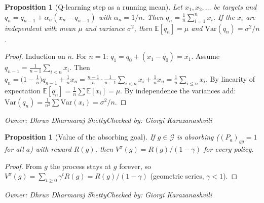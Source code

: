\documentclass[10pt]{article}
\newtheorem{proposition}[theorem]{Proposition}
\theoremstyle{definition}
\newcommand{\GK}{Giorgi Karazanashvili}
\newcommand{\DS}{Dhruv Dharmaraj Shetty}
\newcommand{\signoff}[2]{\par\smallskip\hfill\emph{Owner: #1}\qquad\emph{Checked by: #2}\par\medskip}
\newcommand{\E}{\mathbb{E}}
\newcommand{\Gset}{\mathcal{G}}
\begin{document}
\begin{proposition}[Q-learning step as a running mean]\label{prop:mean}
Let $x_1,x_2,\dots$ be targets and $q_n = q_{n-1} + \alpha_n(x_n - q_{n-1})$ with $\alpha_n = 1/n$. Then $q_n = \frac1n\sum_{i=1}^nx_i$. If the $x_i$ are independent with mean $\mu$ and variance $\sigma^2$, then $\E[q_n] = \mu$ and $\mathrm{Var}(q_n) = \sigma^2/n$.
\end{proposition}
\begin{proof}
Induction on $n$. For $n=1$: $q_1 = q_0 + (x_1 - q_0) = x_1$. Assume $q_{n-1} = \frac1{n-1}\sum_{i<n}x_i$. Then $q_n = \big(1-\frac1n\big)q_{n-1} + \frac1nx_n = \frac{n-1}n\cdot\frac1{n-1}\sum_{i<n}x_i + \frac1nx_n = \frac1n\sum_{i\le n}x_i$. By linearity of expectation $\E[q_n] = \frac1n\sum\E[x_i] = \mu$. By independence the variances add: $\mathrm{Var}(q_n) = \frac1{n^2}\sum\mathrm{Var}(x_i) = \sigma^2/n$.
\end{proof}
\signoff{\DS}{\GK}

\begin{proposition}[Value of the absorbing goal]\label{prop:goal}
If $g\in\Gset$ is absorbing ($(P_a)_{gg} = 1$ for all $a$) with reward $R(g)$, then $V^\pi(g) = R(g)/(1-\gamma)$ for every policy.
\end{proposition}
\begin{proof}
From $g$ the process stays at $g$ forever, so $V^\pi(g) = \sum_{t\ge0}\gamma^tR(g) = R(g)/(1-\gamma)$ (geometric series, $\gamma<1$).
\end{proof}
\signoff{\DS}{\GK}
\end{document}
